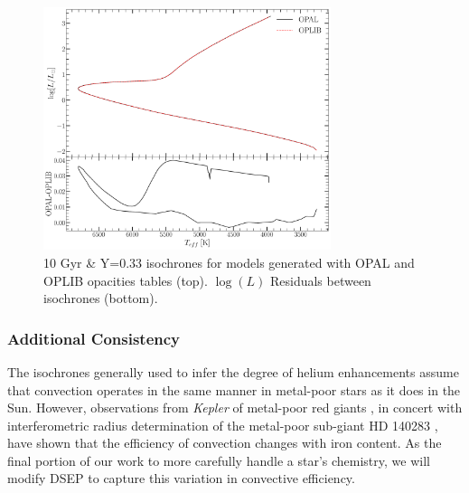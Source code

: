 \begin{figure}
	\centering
	\includegraphics[width=0.75\textwidth]{src/Figures/033ZIsosOPALOPLIB.pdf}
	\caption{10 Gyr \& Y=0.33 isochrones for models generated with OPAL and
	OPLIB opacities tables (top). $\log(L)$ Residuals between isochrones (bottom).}
	\label{fig:NGC2808ISO}
\end{figure}

\subsubsection{Additional Consistency}
The isochrones generally used to infer the degree of helium enhancements assume that
convection operates in the same manner in metal-poor stars as it does in the
Sun. However, observations from \textit{Kepler} of metal-poor red giants
\citep{Bonaca2012, tayar2017correlation}, in concert with interferometric
radius determination of the metal-poor sub-giant HD 140283
\citep{creevey2015benchmark}, have shown that the efficiency of convection
changes with iron content. As the final portion of our work to more carefully
handle a star's chemistry, we will modify DSEP to capture this variation in
convective efficiency. 
